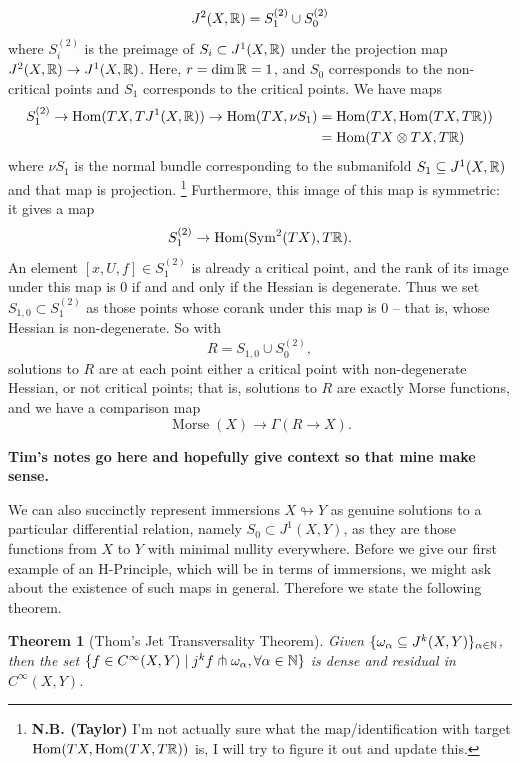 \documentclass{article}
\newtheorem{theorem}{Theorem}[section]
\newtheorem{proposed work}[theorem]{Proposed Work}
\DeclareMathOperator{\Hom}{Hom}
\begin{document}
\[
  J^2(X,\mathbb R) = S_1^{(2)} \cup S_0^{(2)}
\]
where $S_i^{(2)}$ is the preimage of $S_i\subset J^1(X, \mathbb R)$ under the projection map $J^2(X, \mathbb R)\to J^1(X, \mathbb R)$. Here, $r= \dim\mathbb R = 1$, and $S_0$ corresponds to the non-critical points and $S_1$ corresponds to the critical points. We have maps
\begin{align*}
  S^{(2)}_1\to \Hom(TX, TJ^1(X, \R))\to \Hom(TX, \nu S_1) &= \Hom(TX,\Hom(TX,T\R))\\
                                                          &= \Hom(TX\otimes TX, T\R)
\end{align*}
where $\nu S_1$ is the normal bundle corresponding to the submanifold $S_1\subseteq J^1(X,\mathbb R)$ and that map is projection.
\footnote{\textbf{N.B. (Taylor)} I'm not actually sure what the map/identification with target $\Hom(TX, \Hom(TX,T\R))$ is, I will try to figure it out and update this.}
Furthermore, this image of this map is symmetric: it gives a map
\[
  S^{(2)}_1\to\Hom(\operatorname{Sym}^2(TX), T\R).
\]
An element $[x, U, f]\in S^{(2)}_1$ is already a critical point, and the rank of its image under this map is 0 if and and only if the Hessian is degenerate. Thus we set $S_{1,0}\subset S^{(2)}_1$ as those points whose corank under this map is $0$ -- that is, whose Hessian is non-degenerate. So with
\[
R = S_{1,0}\cup S_0^{(2)},
\]
solutions to $R$ are at each point either a critical point with non-degenerate Hessian, or not critical points; that is, solutions to $R$ are exactly Morse functions, and we have a comparison map
\[
  \operatorname{Morse}(X)\to \Gamma(R\to X).
\]

\textbf{Tim's notes go here and hopefully give context so that mine make sense.}
\newline

We can also succinctly represent immersions $X \looparrowright Y$ as genuine solutions to a particular differential relation, namely $S_0 \subset J^1(X,Y)$, as they are those functions from $X$ to $Y$ with minimal nullity everywhere. 
Before we give our first example of an H-Principle, which will be in terms of immersions, we might ask about the existence of such maps in general. Therefore we state the following theorem.

\begin{theorem}[Thom's Jet Transversality Theorem]\label{thm:thomJT}
Given $\{\omega_\alpha \subseteq J^k(X,Y)\}_{\alpha \in \mathbb N}$, then the set $\{f \in C^\infty(X,Y) \mid j^kf \pitchfork \omega_\alpha, \forall \alpha \in \mathbb N\}$ is dense and residual in $C^\infty(X,Y)$.
\end{theorem}
\end{document}
